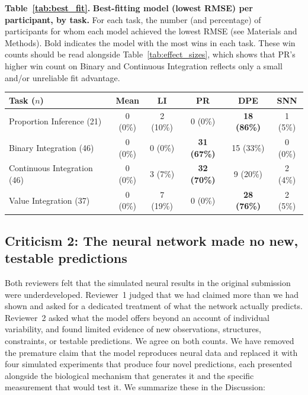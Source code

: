 \vspace{0.6em}
\noindent\begin{minipage}{\textwidth}\color{mscap}\scriptsize {\textbf{Table~\ref{tab:best_fit}.} \textbf{Best-fitting model (lowest RMSE) per participant, by task.} For each task, the number (and percentage) of participants for whom each model achieved the lowest RMSE (see Materials and Methods). Bold indicates the model with the most wins in each task. These win counts should be read alongside Table~\ref{tab:effect_sizes}, which shows that PR's higher win count on Binary and Continuous Integration reflects only a small and/or unreliable fit advantage.\par}
\vspace{0.4em}
\begin{center}
\begin{tabular}{lccccc}
		\hline
		Task ($n$) & Mean & LI & PR & DPE & SNN \\
		\hline
		Proportion Inference (21) & 0 (0\%) & 2 (10\%) & 0 (0\%) & \textbf{18 (86\%)} & 1 (5\%) \\
		Binary Integration (46) & 0 (0\%) & 0 (0\%) & \textbf{31 (67\%)} & 15 (33\%) & 0 (0\%) \\
		Continuous Integration (46) & 0 (0\%) & 3 (7\%) & \textbf{32 (70\%)} & 9 (20\%) & 2 (4\%) \\
		Value Integration (37) & 0 (0\%) & 7 (19\%) & 0 (0\%) & \textbf{28 (76\%)} & 2 (5\%) \\
		\hline
	\end{tabular}
\end{center}
\end{minipage}
\vspace{0.8em}


\subsection*{Criticism 2: The neural network made no new, testable predictions}

Both reviewers felt that the simulated neural results in the original submission were underdeveloped. Reviewer~1 judged that we had claimed more than we had shown and asked for a dedicated treatment of what the network actually predicts. Reviewer~2 asked what the model offers beyond an account of individual variability, and found limited evidence of new observations, structures, constraints, or testable predictions. We agree on both counts. We have removed the premature claim that the model reproduces neural data and replaced it with four simulated experiments that produce four novel predictions, each presented alongside the biological mechanism that generates it and the specific measurement that would test it. We summarize these in the Discussion:



